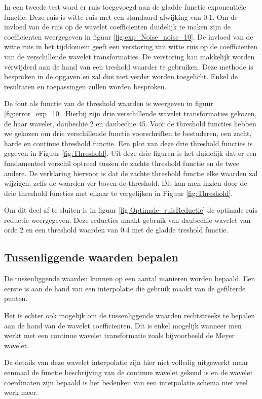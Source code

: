 In een tweede test word er ruis toegevoegd aan de gladde functie exponenti\"ele functie.
Deze ruis is witte ruis met een standaard afwijking van 0.1.
Om de invloed van de ruis op de wavelet coefficienten duidelijk te maken zijn de coefficienten weergegeven in 
figuur \ref{fig:exp_Noise_noise_10}.
De invloed van de witte ruis in het tijddomein geeft  een verstoring van witte ruis op de coefficienten van de verschillende wavelet transformaties.
De verstoring kan makkelijk worden verwijderd aan de hand van een treshold waarder te gebruiken.
Deze methode is besproken in de opgaven en zal dus niet verder worden toegelicht.
Enkel de resultaten en toepassingen zullen worden besproken.

De fout als functie van de threshold waarden is weergeven in figuur \ref{fig:error_exp_10}.
Hierbij zijn drie verschillende wavelet transformaties gekozen, de haar wavelet, daubechie 2 en daubechie 45.
Voor de threshold functies hebben we gekozen om drie verschillende functie voorschriften te bestuderen, een zacht, harde en continue threshold functie.
Een plot van deze drie threshold functies is gegeven in Figuur \ref{fig:Threshold}.
Uit deze drie figuren is het duidelijk dat er een fundamenteel verschil optreed tussen de zachte threshold functie en de twee andere.
De verklaring hiervoor is dat de zachte threshold functie elke waarden zal wijzigen, zelfs de waarden ver boven de threshold.
Dit kan men inzien door de drie threshold functies met elkaar te vergelijken in Figuur \ref{fig:Threshold}.

Om dit deel af te sluiten is in figuur \ref{fig:Optimale_ruisReductie} de optimale ruis reductie weergegeven.
Deze reducties maakt gebruik van daubechie wavelet van orde 2 en een threshold waarden van 0.4 met  de gladde treshold functie.

\subsection{Tussenliggende waarden bepalen}

De tussenliggende waarden kunnen op een aantal manieren worden bepaald.
Een eerste is aan de hand van een interpolatie die gebruik maakt van de gefilterde punten.

Het is echter ook mogelijk om de tussenliggende waarden rechtstreeks te bepalen aan de hand van de wavelet coefficienten.
Dit is enkel mogelijk wanneer men werkt met een continue wavelet transformatie zoals bijvoorbeeld de Meyer wavelet.

De details van deze wavelet interpolatie zijn hier niet volledig uitgewerkt maar eenmaal de functie beschrijving van de continue wavelet gekend is en de wavelet co\"erdinaten zijn bepaald is het bedenken van een interpolatie schema niet veel werk meer.

